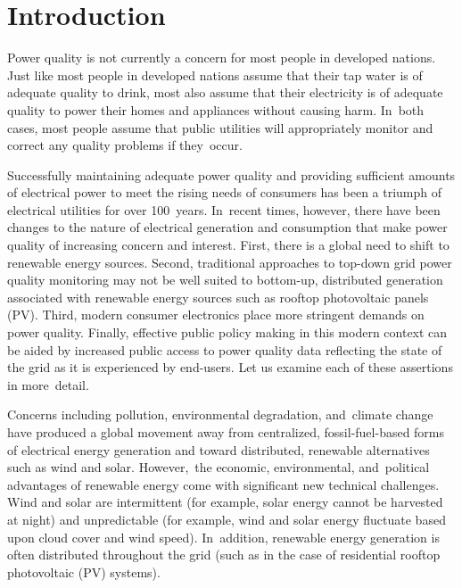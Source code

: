 \documentclass[energies,article,accept,moreauthors,pdftex]{Definitions/mdpi}
\begin{document}
\section{Introduction}


Power quality is not currently a concern for most people in developed nations. Just like most people in developed nations assume that their tap water is of adequate quality to drink, most also assume that their electricity is of adequate quality to power their homes and appliances without causing harm. In~both cases, most people assume that public utilities will appropriately monitor and correct any quality problems if they~occur.

Successfully maintaining adequate power quality and providing sufficient amounts of electrical power to meet the rising needs of consumers has been a triumph of electrical utilities for over 100~years. In~recent times, however, there have been changes to the nature of electrical generation and consumption that make power quality of increasing concern and interest. First, there is a global need to shift to renewable energy sources. Second, traditional approaches to top-down grid power quality monitoring may not be well suited to bottom-up, distributed generation associated with renewable energy sources such as rooftop photovoltaic panels (PV). Third, modern consumer electronics place more stringent demands on power quality. Finally, effective public policy making in this modern context can be aided by increased public access to power quality data reflecting the state of the grid as it is experienced by end-users. Let us examine each of these assertions in more~detail.

 Concerns including pollution, environmental degradation, and~climate change have produced a global movement away from centralized, fossil-fuel-based forms of electrical energy generation and toward distributed, renewable alternatives such as wind and solar. However,~the economic, environmental, and~political advantages of renewable energy come with significant new technical challenges. Wind and solar are intermittent (for example, solar energy cannot be harvested at night) and unpredictable (for example, wind and solar energy fluctuate based upon cloud cover and wind speed). In~addition, renewable energy generation is often distributed throughout the grid (such as in the case of residential rooftop photovoltaic (PV) systems).
\end{document}
